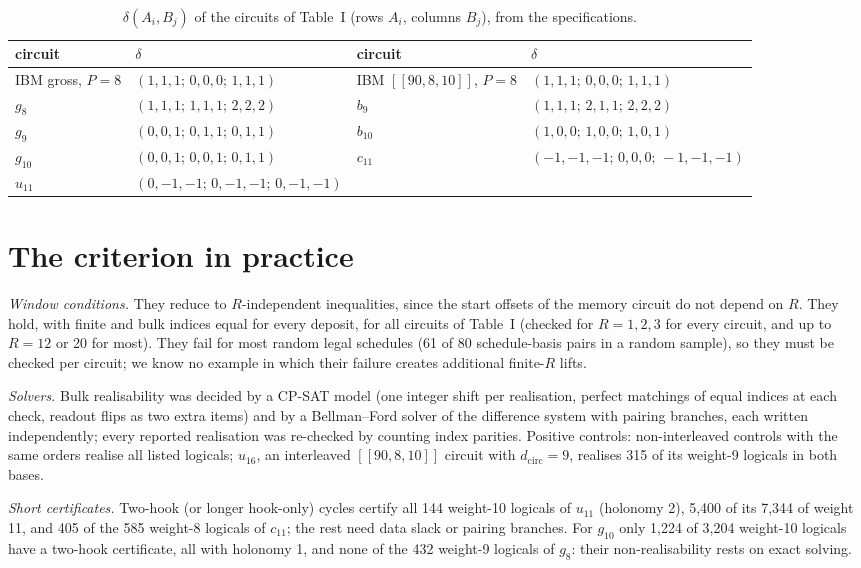 \documentclass[aps,prl,twocolumn,superscriptaddress,nofootinbib]{revtex4-2}
\newcommand{\dcirc}{d_{\mathrm{circ}}}
\newcommand{\code}[1]{[[#1]]}
\begin{document}
\begin{table}[h]
\caption{$\delta(A_i,B_j)$ of the circuits of Table~I (rows $A_i$, columns $B_j$), from the
specifications.}
\label{tab:deltaall}
\begin{ruledtabular}
\begin{tabular}{llll}
circuit & $\delta$ & circuit & $\delta$\\
\hline
IBM gross, $P=8$ & $(1,1,1;\,0,0,0;\,1,1,1)$ & IBM $\code{90,8,10}$, $P=8$ & $(1,1,1;\,0,0,0;\,1,1,1)$\\
$g_8$ & $(1,1,1;\,1,1,1;\,2,2,2)$ & $b_9$ & $(1,1,1;\,2,1,1;\,2,2,2)$\\
$g_9$ & $(0,0,1;\,0,1,1;\,0,1,1)$ & $b_{10}$ & $(1,0,0;\,1,0,0;\,1,0,1)$\\
$g_{10}$ & $(0,0,1;\,0,0,1;\,0,1,1)$ & $c_{11}$ & $(-1,-1,-1;\,0,0,0;\,-1,-1,-1)$\\
$u_{11}$ & $(0,-1,-1;\,0,-1,-1;\,0,-1,-1)$ & & \\
\end{tabular}
\end{ruledtabular}
\end{table}

\section{The criterion in practice}\label{sm:criterion}
\emph{Window conditions.} They reduce to $R$-independent inequalities, since the start
offsets of the memory circuit do not depend on $R$. They hold, with finite and bulk indices
equal for every deposit, for all circuits of Table~I (checked for $R=1,2,3$ for every
circuit, and up to $R=12$ or 20 for most). They fail for most random legal
schedules (61 of 80 schedule-basis pairs in a random sample), so they must be checked per
circuit; we know no example in which their failure creates additional finite-$R$ lifts.

\emph{Solvers.} Bulk realisability was decided by a CP-SAT model (one integer shift per
realisation, perfect matchings of equal indices at each check, readout flips as two extra
items) and by a Bellman--Ford solver of the difference system with pairing branches, each
written independently; every reported realisation was re-checked by counting index
parities. Positive controls: non-interleaved controls with the same orders realise all
listed logicals; $u_{16}$, an interleaved $\code{90,8,10}$ circuit with $\dcirc=9$,
realises 315 of its weight-9 logicals in both bases.

\emph{Short certificates.} Two-hook (or longer hook-only) cycles certify all 144 weight-10
logicals of $u_{11}$ (holonomy 2), 5,400 of its 7,344 of weight 11, and 405 of the 585
weight-8 logicals of $c_{11}$; the rest need data slack or pairing branches. For $g_{10}$
only 1,224 of 3,204 weight-10 logicals have a two-hook certificate, all with holonomy 1,
and none of the 432 weight-9 logicals of $g_8$: their non-realisability rests on exact
solving.
\end{document}
